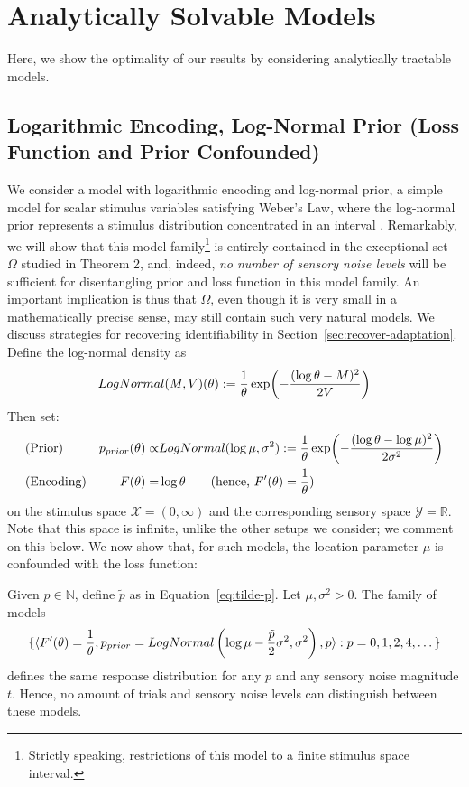 




\section{Analytically Solvable Models}
Here, we show the optimality of our results by considering analytically tractable models.

\subsection{Logarithmic Encoding, Log-Normal Prior (Loss Function and Prior Confounded)}
We consider a model with logarithmic encoding and log-normal prior, a simple model for scalar stimulus variables satisfying Weber's Law, where the log-normal prior represents a stimulus distribution concentrated in an interval  \cite{Petzschner2011IterativeBE, hahn2024unifying}.
Remarkably, we will show that this model family\footnote{Strictly speaking, restrictions of this model to a finite stimulus space interval.} is entirely contained in the exceptional set $\Omega$ studied in Theorem 2, and, indeed, \emph{no number of sensory noise levels} will be sufficient for disentangling prior and loss function in this model family. An important implication is thus that $\Omega$, even though it is very small in a mathematically precise sense, may still contain such very natural models.
We discuss strategies for recovering identifiability in Section~\ref{sec:recover-adaptation}.
Define the log-normal density as
\begin{equation}
LogNormal(M, V)(\theta) := \frac{1}{\theta} \exp(-\frac{(\log \theta - M)^2}{2V}) \\
\end{equation}
Then set:
\begin{align*}
&\text{(Prior) } & \Prior(\theta) \propto& LogNormal(\log\mu, \sigma^2) := \frac{1}{\theta} \exp(-\frac{(\log \theta - \log \mu)^2}{2\sigma^2}) \\
&\text{(Encoding)} & F(\theta) = & \log \theta  \text{\ \ \ \ \ \  (hence, } F'(\theta) = \frac{1}{\theta}\text{)}
\end{align*}
on the stimulus space $\mathcal{X} = (0,\infty)$ and the corresponding sensory space $\mathcal{Y} = \mathbb{R}$.
Note that this space is infinite, unlike the other setups we consider; we comment on this below.
We now show that, for such models, the location parameter $\mu$ is confounded with the loss function:
\begin{thm}
Given $p \in \mathbb{N}$, define $\tilde{p}$ as in Equation~\ref{eq:tilde-p}.
Let $\mu, \sigma^2 > 0$.
    The family of models
    \begin{equation}\label{eq:lognormal-family}
      \{  \langle F'(\theta) = \frac{1}{\theta}, p_{prior} = LogNormal\left(\log \mu - \frac{\tilde{p}}{2}\sigma^2, \sigma^2\right), p\rangle : p =0, 1, 2, 4, \dots\}
    \end{equation}
    defines the same response distribution for any $p$ and any sensory noise magnitude $t$.
    Hence, no amount of trials and sensory noise levels can distinguish between these models.
\end{thm}


